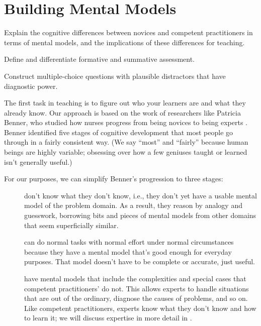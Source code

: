 \chapter{Building Mental Models}\label{s:models}

\begin{objectives}

\item Explain the cognitive differences between novices and competent
  practitioners in terms of mental models, and the implications of
  these differences for teaching.

\item Define and differentiate formative and summative assessment.

\item Construct multiple-choice questions with plausible distractors
  that have diagnostic power.

\end{objectives}

The first task in teaching is to figure out who your learners are and
what they already know.  Our approach is based on the work of
researchers like Patricia Benner, who studied how nurses progress from
being novices to being experts \cite{Benn2000}. Benner identified five
stages of cognitive development that most people go through in a
fairly consistent way. (We say ``most'' and ``fairly'' because human
beings are highly variable; obsessing over how a few geniuses taught
or learned isn't generally useful.)

For our purposes, we can simplify Benner's progression to three
stages:

\begin{description}

  \item[] don't know what they don't know,
    i.e., they don't yet have a usable mental model of the problem
    domain.  As a result, they reason by analogy and guesswork,
    borrowing bits and pieces of mental models from other domains that
    seem superficially similar.

  \item[]
    can do normal tasks with normal effort under normal circumstances
    because they have a mental model that's good enough for everyday
    purposes.  That model doesn't have to be complete or accurate,
    just useful.

  \item[] have mental models that include
    the complexities and special cases that competent practitioners'
    do not.  This allows experts to handle situations that are out of
    the ordinary, diagnose the causes of problems, and so on.  Like
    competent practitioners, experts know what they don't know and how
    to learn it; we will discuss expertise in more detail in
    .

\end{description}

